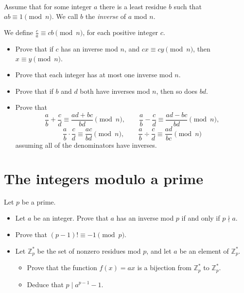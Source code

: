 \documentclass{article}
\begin{document}
  Assume that for some integer $a$ there is a least residue $b$ such that
  $ab\equiv 1\pmod n$. We call $b$ the \emph{inverse} of $a$ mod $n$.

  We define $\frac ca\equiv cb\pmod n$, for each
  positive integer $c$.
  \begin{itemize}
    \item Prove that if $c$ has an inverse mod $n$, and $cx\equiv cy\pmod n$,
      then $x\equiv y\pmod n$.
    \item Prove that each integer has at most one inverse mod $n$.
    \item Prove that if $b$ and $d$ both have inverses mod $n$, then so does
      $bd$.
    \item Prove that
      \[\frac ab+\frac cd\equiv \frac{ad+bc}{bd}\pmod n,\qquad \frac ab-\frac
      cd\equiv\frac{ad-bc}{bd}\pmod n,\]\[\frac ab\cdot\frac
      cd\equiv\frac{ac}{bd}\pmod n,\qquad \frac ab\div\frac
      cd\equiv\frac{ad}{bc}\pmod n\]
      assuming all of the denominators have inverses.
  \end{itemize}
\section{The integers modulo a prime}
  Let $p$ be a prime.
  \begin{itemize}
    \item Let $a$ be an integer. Prove that $a$ has an inverse mod $p$ if and
      only if $p\nmid a$.
    \item Prove that $(p-1)!\equiv -1\pmod p$.
    \item Let $\mathbb Z_p^*$ be the set of nonzero residues mod $p$, and let $a$ be an
      element of $\mathbb Z_p^*$. 
      \begin{itemize}
        \item 
          Prove that the function $f(x)=ax$ is a bijection from $\mathbb Z_p^*$
          to $\mathbb Z_p^*$.
        \item Deduce that $p\mid a^{p-1}-1$.
      \end{itemize}
  \end{itemize}
  \newpage
\end{document}
